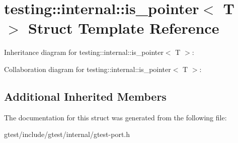 \hypertarget{structtesting_1_1internal_1_1is__pointer}{}\section{testing\+:\+:internal\+:\+:is\+\_\+pointer$<$ T $>$ Struct Template Reference}
\label{structtesting_1_1internal_1_1is__pointer}


Inheritance diagram for testing\+:\+:internal\+:\+:is\+\_\+pointer$<$ T $>$\+:


Collaboration diagram for testing\+:\+:internal\+:\+:is\+\_\+pointer$<$ T $>$\+:
\subsection*{Additional Inherited Members}


The documentation for this struct was generated from the following file\+:\begin{DoxyCompactItemize}
\item 
gtest/include/gtest/internal/gtest-\/port.\+h\end{DoxyCompactItemize}
